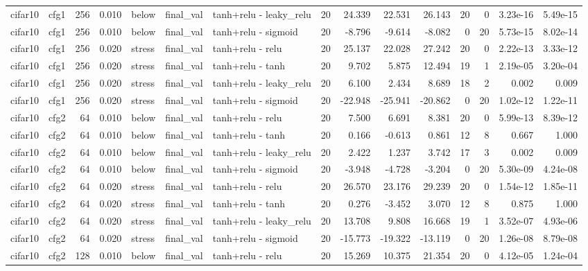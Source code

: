 \begin{table}[htbp]
{\begin{tabular}{@{}llrrlllrrrrrrrr@{}}
cifar10 & cfg1 & 256 & 0.010 & below & final\_val & tanh+relu - leaky\_relu & 20 & 24.339 & 22.531 & 26.143 & 20 & 0 & 3.23e-16 & 5.49e-15 \\
cifar10 & cfg1 & 256 & 0.010 & below & final\_val & tanh+relu - sigmoid & 20 & -8.796 & -9.614 & -8.082 & 0 & 20 & 5.73e-15 & 8.02e-14 \\
cifar10 & cfg1 & 256 & 0.020 & stress & final\_val & tanh+relu - relu & 20 & 25.137 & 22.028 & 27.242 & 20 & 0 & 2.22e-13 & 3.33e-12 \\
cifar10 & cfg1 & 256 & 0.020 & stress & final\_val & tanh+relu - tanh & 20 & 9.702 & 5.875 & 12.494 & 19 & 1 & 2.19e-05 & 3.20e-04 \\
cifar10 & cfg1 & 256 & 0.020 & stress & final\_val & tanh+relu - leaky\_relu & 20 & 6.100 & 2.434 & 8.689 & 18 & 2 & 0.002 & 0.009 \\
cifar10 & cfg1 & 256 & 0.020 & stress & final\_val & tanh+relu - sigmoid & 20 & -22.948 & -25.941 & -20.862 & 0 & 20 & 1.02e-12 & 1.22e-11 \\
cifar10 & cfg2 & 64 & 0.010 & below & final\_val & tanh+relu - relu & 20 & 7.500 & 6.691 & 8.381 & 20 & 0 & 5.99e-13 & 8.39e-12 \\
cifar10 & cfg2 & 64 & 0.010 & below & final\_val & tanh+relu - tanh & 20 & 0.166 & -0.613 & 0.861 & 12 & 8 & 0.667 & 1.000 \\
cifar10 & cfg2 & 64 & 0.010 & below & final\_val & tanh+relu - leaky\_relu & 20 & 2.422 & 1.237 & 3.742 & 17 & 3 & 0.002 & 0.009 \\
cifar10 & cfg2 & 64 & 0.010 & below & final\_val & tanh+relu - sigmoid & 20 & -3.948 & -4.728 & -3.204 & 0 & 20 & 5.30e-09 & 4.24e-08 \\
cifar10 & cfg2 & 64 & 0.020 & stress & final\_val & tanh+relu - relu & 20 & 26.570 & 23.176 & 29.239 & 20 & 0 & 1.54e-12 & 1.85e-11 \\
cifar10 & cfg2 & 64 & 0.020 & stress & final\_val & tanh+relu - tanh & 20 & 0.276 & -3.452 & 3.070 & 12 & 8 & 0.875 & 1.000 \\
cifar10 & cfg2 & 64 & 0.020 & stress & final\_val & tanh+relu - leaky\_relu & 20 & 13.708 & 9.808 & 16.668 & 19 & 1 & 3.52e-07 & 4.93e-06 \\
cifar10 & cfg2 & 64 & 0.020 & stress & final\_val & tanh+relu - sigmoid & 20 & -15.773 & -19.322 & -13.119 & 0 & 20 & 1.26e-08 & 8.79e-08 \\
cifar10 & cfg2 & 128 & 0.010 & below & final\_val & tanh+relu - relu & 20 & 15.269 & 10.375 & 21.354 & 20 & 0 & 4.12e-05 & 1.24e-04 \\

\end{tabular}}
\end{table}
